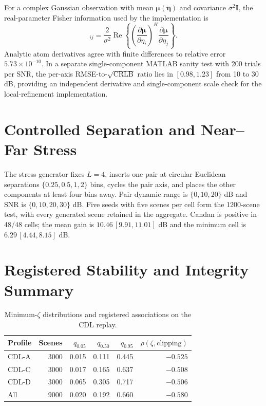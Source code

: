 \documentclass[11pt,onecolumn]{IEEEtran}
\begin{document}
For a complex Gaussian observation with mean
$\boldsymbol{\mu}(\boldsymbol{\eta})$ and covariance $\sigma^2\mathbf I$, the
real-parameter Fisher information used by the implementation is
\begin{equation}
 [\mathbf F(\boldsymbol{\eta})]_{ij}
 =\frac{2}{\sigma^2}\operatorname{Re}\!\left\{
 \left(\frac{\partial\boldsymbol{\mu}}{\partial\eta_i}\right)^H
 \frac{\partial\boldsymbol{\mu}}{\partial\eta_j}\right\}.
\end{equation}
Analytic atom derivatives agree with finite differences to relative error
$5.73\times10^{-10}$. In a separate single-component MATLAB sanity test with
200 trials per SNR, the per-axis RMSE-to-$\sqrt{\mathrm{CRLB}}$ ratio lies in
$[0.98,1.23]$ from 10 to 30 dB, providing an independent derivative and
single-component scale check for the local-refinement implementation.

\FloatBarrier
\section{Controlled Separation and Near--Far Stress}

The stress generator fixes $L=4$, inserts one pair at circular Euclidean
separations $\{0.25,0.5,1,2\}$ bins, cycles the pair axis, and places the other
components at least four bins away. Pair dynamic range is
$\{0,10,20\}$ dB and SNR is $\{0,10,20,30\}$ dB. Five seeds with five scenes
per cell form the 1200-scene test, with every generated scene retained in the
aggregate. Candan is positive in 48/48 cells; the mean gain is
$10.46\,[9.91,11.01]$ dB and the minimum cell is
$6.29\,[4.44,8.15]$ dB.



\section{Registered Stability and Integrity Summary}

\begin{table}[!ht]
\centering
\caption{Minimum-$\zeta$ distributions and registered associations on the CDL replay.}
\label{tab:supp_zeta_summary}
\footnotesize
\begin{tabular}{lrrrrr}
\toprule
Profile & Scenes & $q_{0.05}$ & $q_{0.50}$ & $q_{0.95}$ & $\rho(\zeta,\text{clipping})$ \\
\midrule
CDL-A & 3000 & 0.015 & 0.111 & 0.445 & $-0.525$ \\
CDL-C & 3000 & 0.017 & 0.165 & 0.637 & $-0.508$ \\
CDL-D & 3000 & 0.065 & 0.305 & 0.717 & $-0.506$ \\
All & 9000 & 0.020 & 0.192 & 0.660 & $-0.580$ \\
\bottomrule
\end{tabular}
\end{table}
\end{document}
